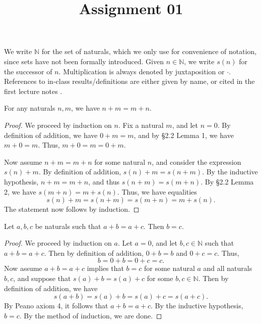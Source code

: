 \documentclass[11pt, letterpaper]{article}
\title{Assignment 01}
\begin{document}
\makeproblem

\begin{notation}
	We write $\mathbb{N} $ for the set of naturals, which we only use for convenience of notation, since sets have not been formally introduced. Given $n\in\mathbb{N} $, we write $s(n)$ for the successor of $n$. Multiplication is always denoted by juxtaposition or $\cdot $. References to in-class results/definitions are either given by name, or cited in the first lecture notes \cite{lec-1}.
\end{notation}


\begin{problem}\label{prob:1}
	For any naturals $n,m$, we have $n+m=m+n$.
\end{problem}
\begin{proof}
	We proceed by induction on $n$. Fix a natural $m$, and let $n=0$. By definition of addition, we have $0+m=m$, and by \cite{lec-1} \S2.2 Lemma 1, we have $m+0=m$. Thus, $m+0=m=0+m$.

	Now assume $n+m=m+n$ for some natural $n$, and consider the expression $s(n)+m$. By definition of addition, $s(n)+m = s(n+m)$. By the inductive hypothesis, $n+m=m+n$, and thus $s(n+m) = s(m+n)$. By \cite{lec-1} \S2.2 Lemma 2, we have $s(m+n) = m+s(n)$. Thus, we have equalities
	\[
		s(n)+m = s(n+m) = s(m+n) = m+s(n).
	\]
	The statement now follows by induction.
\end{proof}

\begin{problem}\label{prob:2}
	Let $a,b,c$ be naturals such that $a+b=a+c$. Then $b=c$.
\end{problem}
\begin{proof}
	We proceed by induction on $a$. Let $a=0$, and let $b,c\in\mathbb{N} $ such that $a+b=a+c$. Then by definition of addition, $0+b=b$ and $0+c=c$. Thus,
	\[
		b=0+b=0+c=c
	.\]
	Now assume $a+b=a+c$ implies that $b=c$ for some natural $a$ and all naturals $b,c$, and suppose that $s(a)+b=s(a)+c$ for some $b,c\in\mathbb{N} $. Then by definition of addition, we have
	\[
		s(a+b)=s(a)+b = s(a)+c = s(a+c)
	.\]
	By Peano axiom 4, it follows that $a+b=a+c$. By the inductive hypothesis, $b=c$. By the method of induction, we are done.
\end{proof}
\end{document}
